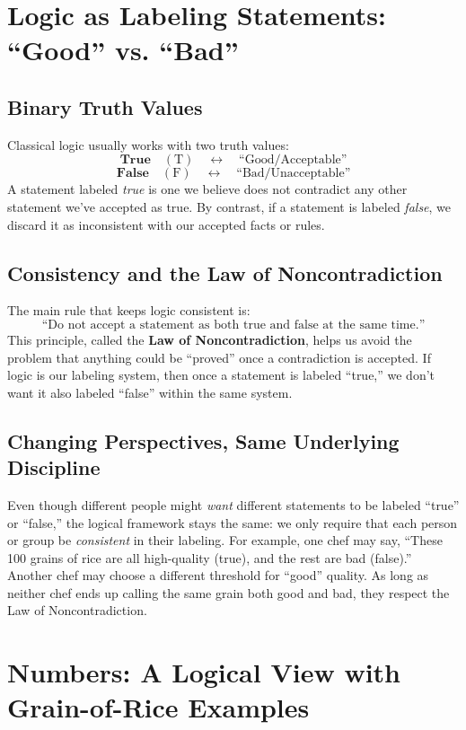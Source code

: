 \documentclass[12pt]{article}
\begin{document}
\section{Logic as Labeling Statements: ``Good'' vs. ``Bad''}
\label{sec:logic-good-bad}

\subsection{Binary Truth Values}
Classical logic usually works with two truth values:
\[
\textbf{True} \quad (\text{T}) \quad \leftrightarrow \quad 
\text{``Good/Acceptable''}
\]
\[
\textbf{False} \quad (\text{F}) \quad \leftrightarrow \quad 
\text{``Bad/Unacceptable''}
\]
A statement labeled \emph{true} is one we believe does not contradict any
other statement we've accepted as true. By contrast, if a statement is
labeled \emph{false}, we discard it as inconsistent with our accepted
facts or rules.

\subsection{Consistency and the Law of Noncontradiction}
The main rule that keeps logic consistent is:
\[
\text{``Do not accept a statement as both true and false 
   at the same time.''}
\]
This principle, called the \textbf{Law of Noncontradiction}, helps us avoid
the problem that anything could be ``proved'' once a contradiction is
accepted. If logic is our labeling system, then once a statement is labeled
``true,'' we don't want it also labeled ``false'' within the same system.

\subsection{Changing Perspectives, Same Underlying Discipline}
Even though different people might \emph{want} different statements to be
labeled ``true'' or ``false,'' the logical framework stays the same:
we only require that each person or group be \emph{consistent} in their
labeling. For example, one chef may say, ``These 100 grains of rice are
all high-quality (true), and the rest are bad (false).'' Another chef
may choose a different threshold for ``good'' quality. As long as neither
chef ends up calling the same grain both good and bad, they respect
the Law of Noncontradiction.

\section{Numbers: A Logical View with Grain-of-Rice Examples}
\label{sec:numbers}
\end{document}
